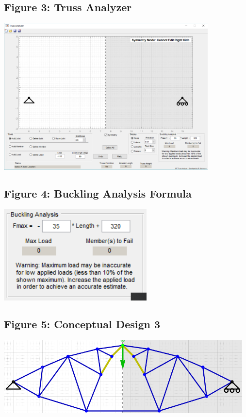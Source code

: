 \documentclass{article}
\begin{document}
\subsection{Figure 3: Truss Analyzer}
\begin{center}{\includegraphics[height=8cm]{TrussAnalyzerProgram.png}}\end{center}

\subsection{Figure 4: Buckling Analysis Formula}
\begin{center}{\includegraphics[height=5cm]{BucklingAnalysis.png}}\end{center}

\newpage
\subsection{Figure 5: Conceptual Design 3}
\begin{center}{\includegraphics[height=4cm]{truss449.png}}\end{center}
\end{document}
